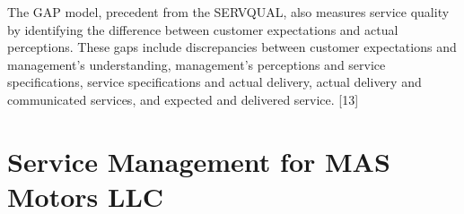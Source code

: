 The GAP model, precedent from the SERVQUAL, also measures service quality by identifying the difference between customer expectations and actual perceptions. These gaps include discrepancies between customer expectations and management's understanding, management’s perceptions and service specifications, service specifications and actual delivery, actual delivery and communicated services, and expected and delivered service. [13]

\section{Service Management for MAS Motors LLC}